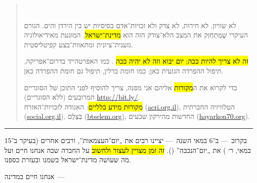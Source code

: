 \begin{quote}
\begin{center}
	\\
\end{center}

לא שוויון, לא חירות, לא צדק ולא זכויות־אדם בסיסיות יש בין הירדן והים. הגורם העיקרי שֶׁמְּתַחְזֵק את המצב הלא־צודק הזה הוא \hl{מדינת־ישראל}, המוּנעת מאידיאולוגיה גזענית־ציונית ומתאוות־בצע קפיטליסטית.

\hl{זה לא צריך להיות ככה; יום יבוא וזה לא יהיה ככה }. כמו האפרטהייד בדרום־אפריקה, תיפול ההפרדה הגזעית כאן; כמו חומת ברלין, תיפול גם חומת ההפרדה כאן.


{\small כדי לקרוא את ה\hl{מקורות} אליהם אני מפנה, צריך להוסיף לפני התוכן של הסוגריים המרובעים (ללא הסוגריים) {\url{http://bit.ly/}}.\\
\hl{מקורות מידע כלליים}: האגודה לזכויות־האזרח (\url{acri.org.il}), הטלוויזיה החברתית (\url{social.org.il}), בְּצֶלֶם (\url{btselem.org}), החדשות מהירקון שבעים (\url{hayarkon70.org}).}
\end{quote}

\hrule

בקרוב~— ב־6 במאי השנה~— יציינו רבים את „יום־העצמ{\small א}ות”, ורבים אחרים (בעיקר ב־15 במאי, ר׳ ) את „יום־הנכבה” (). \hl{זה זמן מצויין לעצור ולחשוב} על החברה שבה אנחנו חיים ועל מה שעושה מדינת־ישראל בשמנו ובעזרת כספנו.

{\setlength\parindent{-0.5em}\Large אנחנו חיים במדינה~—}

